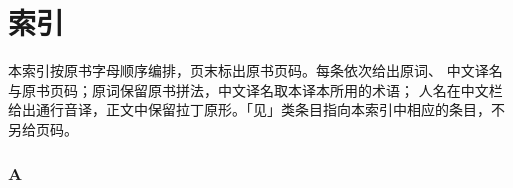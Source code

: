 
\chapter*{索引}

本索引按原书字母顺序编排，页末标出原书页码。每条依次给出原词、
中文译名与原书页码；原词保留原书拼法，中文译名取本译本所用的术语；
人名在中文栏给出通行音译，正文中保留拉丁原形。「见」类条目指向本索引中相应的条目，不另给页码。


\subsection*{A}
\small

